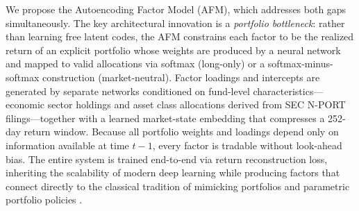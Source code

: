 We propose the Autoencoding Factor Model (AFM), which addresses both gaps simultaneously. The key architectural innovation is a \emph{portfolio bottleneck}: rather than learning free latent codes, the AFM constrains each factor to be the realized return of an explicit portfolio whose weights are produced by a neural network and mapped to valid allocations via softmax (long-only) or a softmax-minus-softmax construction (market-neutral). Factor loadings and intercepts are generated by separate networks conditioned on fund-level characteristics---economic sector holdings and asset class allocations derived from SEC N-PORT filings---together with a learned market-state embedding that compresses a 252-day return window. Because all portfolio weights and loadings depend only on information available at time $t-1$, every factor is tradable without look-ahead bias. The entire system is trained end-to-end via return reconstruction loss, inheriting the scalability of modern deep learning while producing factors that connect directly to the classical tradition of mimicking portfolios \citep{Huberman1987mimicking} and parametric portfolio policies \citep{Brandt2009parametric}.

